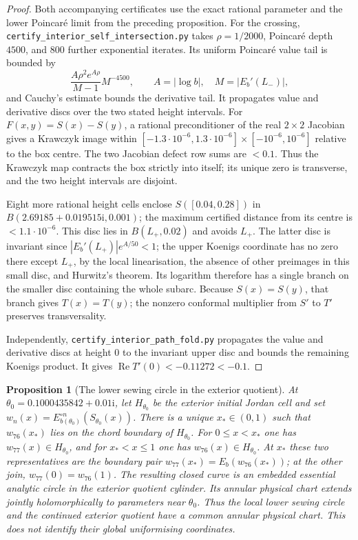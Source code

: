 \documentclass[11pt]{amsart}
\newtheorem{proposition}[theorem]{Proposition}
\theoremstyle{definition}
\newcommand{\ii}{\mathrm{i}}
\begin{document}
\begin{proof}
Both accompanying certificates use the exact rational parameter and
the lower Poincar\'e limit from the preceding proposition.  For the
crossing, \nolinkurl{certify_interior_self_intersection.py} takes
$\rho=1/2000$, Poincar\'e depth $4500$, and $800$ further
exponential iterates.  Its uniform Poincar\'e value tail is bounded by
\[
 \frac{A\rho^2e^{A\rho}}{M-1}M^{-4500},\qquad
 A=|\log b|,\quad M=|E_b'(L_-)|,
\]
and Cauchy's estimate bounds the derivative tail.  It propagates
value and derivative discs over the two stated height intervals.
For $F(x,y)=S(x)-S(y)$, a rational preconditioner of the real
$2\times2$ Jacobian gives a Krawczyk image within
$[-1.3\cdot10^{-6},1.3\cdot10^{-6}]\times[-10^{-6},10^{-6}]$
relative to the box centre.  The two Jacobian defect row sums are
$<0.1$.  Thus the Krawczyk map contracts the box strictly into
itself; its unique zero is transverse, and the two height intervals
are disjoint.

Eight more rational height cells enclose $S([0.04,0.28])$ in
$B(2.69185+0.019515\ii,0.001)$; the maximum certified distance
from its centre is $<1.1\cdot10^{-6}$.  This disc lies in
$B(L_+,0.02)$ and avoids $L_+$.  The latter disc is invariant since
$|E_b'(L_+)|e^{A/50}<1$; the upper Koenigs coordinate has no zero
there except $L_+$, by the local linearisation, the absence of other
preimages in this small disc, and Hurwitz's theorem.  Its logarithm
therefore has a single branch on the smaller disc containing the
whole subarc.  Because $S(x)=S(y)$, that branch gives $T(x)=T(y)$;
the nonzero conformal multiplier from $S'$ to $T'$ preserves
transversality.

Independently, \nolinkurl{certify_interior_path_fold.py} propagates
the value and derivative discs at height $0$ to the invariant upper
disc and bounds the remaining Koenigs product.  It gives
$\operatorname{Re}T'(0)<-0.11272<-0.1$.
\end{proof}

\begin{proposition}[The lower sewing circle in the exterior quotient]
\label{prop:interior-quotient-loop}
At $\theta_0=0.1000435842+0.01\ii$, let $H_{\theta_0}$ be the
exterior initial Jordan cell and set
$w_n(x)=E_{b(\theta_0)}^{\circ n}(S_{\theta_0}(x))$.
There is a unique $x_*\in(0,1)$ such that
$w_{76}(x_*)$ lies on the chord boundary of $H_{\theta_0}$.
For $0\le x<x_*$ one has $w_{77}(x)\in H_{\theta_0}$, and for
$x_*<x\le1$ one has $w_{76}(x)\in H_{\theta_0}$.
At $x_*$ these two representatives are the boundary pair
$w_{77}(x_*)=E_b(w_{76}(x_*))$; at the other join,
$w_{77}(0)=w_{76}(1)$.  The resulting closed curve is an embedded
essential analytic circle in the exterior quotient cylinder.
Its annular physical chart extends jointly holomorphically to
parameters near $\theta_0$.  Thus the local lower sewing circle and the
continued exterior quotient have a common annular physical chart.
This does not identify their global uniformising coordinates.
\end{proposition}
\end{document}
